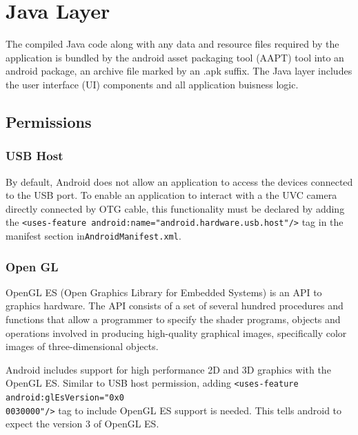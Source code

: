 \section{Java Layer}


The compiled Java code along with any data and resource files required by the application is bundled by the android asset packaging tool (AAPT) tool into an android package, an archive file marked by an .apk suffix.
The Java layer includes the user interface (UI) components and all application buisness logic.

\subsection{Permissions}
\subsubsection{USB Host}
By default, Android does not allow an application to access the devices connected to the USB  port. To enable an application to interact with a the UVC camera directly connected by OTG cable, this functionality must be declared by adding the \texttt{<uses-feature android:name="android.hardware.usb.host"/>} tag in the manifest section in\texttt{AndroidManifest.xml}. 

\subsubsection{Open GL}

OpenGL ES (Open Graphics Library for Embedded Systems) is an API to graphics hardware. The API consists of a set of several hundred procedures and functions that allow a programmer to specify the shader programs, objects and operations involved in producing high-quality graphical images, specifically color images of three-dimensional objects\parencite{openGl}.


Android includes support for high performance 2D and 3D graphics with the OpenGL ES. Similar to USB host permission, adding  \texttt{<uses-feature android:glEsVersion="0x0\\0030000"/>} tag to include OpenGL ES support is needed. This tells android to expect the version 3 of OpenGL ES.








 
